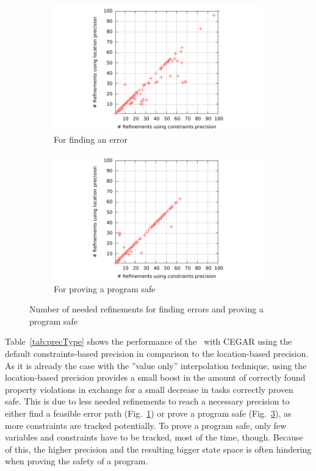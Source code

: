\begin{figure}
\begin{subfigure}[b]{.48\textwidth}
\includegraphics[trim=2cm 0 1cm 0, clip=true, scale=.9]{evaluation/sp_constPrec_locPrec_refinementsErrorFinding}
\caption{For finding an error}
\label{fig:precType:refsFalse}
\end{subfigure}%
\hfill
\begin{subfigure}[b]{.48\textwidth}
\includegraphics[trim=2cm 0 1cm 0, clip=true, scale=.9]{evaluation/sp_constPrec_locPrec_refinementsSafeProving}
\caption{For proving a program safe}
\label{fig:precType:refsTrue}
\end{subfigure}
\caption{Number of needed refinements for finding errors and proving a program safe}
\end{figure}

Table~\ref{tab:precType} shows the performance of the \symbolicExecutionCPA\ with CEGAR using the default constraints-based precision in comparison to the location-based precision.
As it is already the case with the ''value only'' interpolation technique, using the location-based precision provides a small boost in the amount of correctly found property violations in exchange for a small decrease in tasks correctly proven safe.
This is due to less needed refinements to reach a necessary precision to either find a feasible error path (Fig.~\ref{fig:precType:refsFalse}) or prove a program safe (Fig.~\ref{fig:precType:refsTrue}), as more constraints are tracked potentially.
To prove a program safe, only few variables and constraints have to be tracked, most of the time, though.
Because of this, the higher precision and the resulting bigger state space is often hindering when proving the safety of a program.

